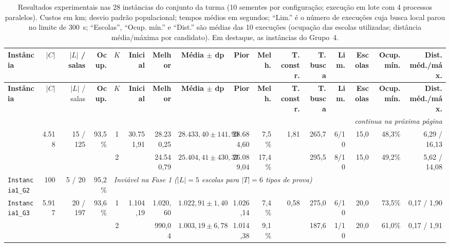 {\scriptsize
\setlength{\tabcolsep}{2.6pt}
\begin{longtable}{lrrrcrrrrrrrrrrr}
\caption{Resultados experimentais nas 28 instâncias do conjunto da turma (10 sementes por configuração; execução em lote com 4 processos paralelos). Custos em km; desvio padrão populacional; tempos médios em segundos; ``Lim.'' é o número de execuções cuja busca local parou no limite de 300~s; ``Escolas'', ``Ocup. mín.'' e ``Dist.'' são médias das 10 execuções (ocupação das escolas utilizadas; distância média/máxima por candidato). Em destaque, as instâncias do Grupo~4.}\label{tab:resultados}\\
\toprule
\textbf{Instância} & $|C|$ & $|L|$ / salas & \textbf{Ocup.} & $K$ & \textbf{Inicial} & \textbf{Melhor} & \textbf{Média $\pm$ dp} & \textbf{Pior} & \textbf{Melh.} & \textbf{T. constr.} & \textbf{T. busca} & \textbf{Lim.} & \textbf{Escolas} & \textbf{Ocup. mín.} & \textbf{Dist. méd./máx.} \\
\midrule
\endfirsthead
\toprule
\textbf{Instância} & $|C|$ & $|L|$ / salas & \textbf{Ocup.} & $K$ & \textbf{Inicial} & \textbf{Melhor} & \textbf{Média $\pm$ dp} & \textbf{Pior} & \textbf{Melh.} & \textbf{T. constr.} & \textbf{T. busca} & \textbf{Lim.} & \textbf{Escolas} & \textbf{Ocup. mín.} & \textbf{Dist. méd./máx.} \\
\midrule
\endhead
\midrule \multicolumn{16}{r}{\textit{continua na próxima página}} \\ \endfoot
\bottomrule \endlastfoot
\multirow{2}{*}{\texttt{Instancia1\_G1}} & \multirow{2}{*}{4.518} & \multirow{2}{*}{15 / 125} & \multirow{2}{*}{93,5\%} & 1 & \multirow{2}{*}{30.751,91} & 28.230,25 & $28.433,40 \pm 141,93$ & 28.684,60 & 7,5\% & \multirow{2}{*}{1,81} & 265,7 & 6/10 & 15,0 & 48,3\% & 6,29 / 16,13 \\
& & & & 2 &  & 24.540,79 & $25.404,41 \pm 430,37$ & 26.089,04 & 17,4\% &  & 295,5 & 8/10 & 15,0 & 49,2\% & 5,62 / 14,08 \\
\midrule
\texttt{Instancia1\_G2} & 100 & 5 / 20 & 95,2\% & \multicolumn{12}{l}{\textit{Inviável na Fase 1 ($|L|=5$ escolas para $|T|=6$ tipos de prova)}} \\
\midrule
\multirow{2}{*}{\texttt{Instancia1\_G3}} & \multirow{2}{*}{5.917} & \multirow{2}{*}{20 / 197} & \multirow{2}{*}{93,6\%} & 1 & \multirow{2}{*}{1.104,19} & 1.020,60 & $1.022,91 \pm 1,40$ & 1.026,14 & 7,4\% & \multirow{2}{*}{0,58} & 275,0 & 6/10 & 20,0 & 73,5\% & 0,17 / 1,90 \\
& & & & 2 &  & 990,04 & $1.003,19 \pm 6,78$ & 1.014,38 & 9,1\% &  & 187,6 & 1/10 & 20,0 & 61,0\% & 0,17 / 1,91 \\

\end{longtable}}

